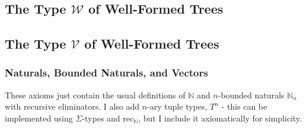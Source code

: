 \documentclass{article}
\newcommand{\set}[1]{\mathcal{U}_#1}
\newcommand{\W}{\mathcal{W}}
\newcommand{\V}{\mathcal{V}}
\newcommand{\nat}{\mathbb{N}}
\newcommand{\rec}{\mathrm{rec}}
\newcommand{\fun}[2]{\lambda #1. #2}
\newcommand{\for}[2]{\Pi_{#1}#2}
\newcommand{\evals}{\rightsquigarrow^{nf}}
\begin{document}
\subsection{The Type $\W$ of Well-Formed Trees}


\subsection{The Type $\V$ of Well-Formed Trees}

\subsubsection{Naturals, Bounded Naturals, and Vectors}

These axioms just contain the usual definitions of $\nat$ and $n$-bounded naturals $\nat_n$ with recursive eliminators. I also add $n$-ary tuple types, $T^n$ - this can be implemented using $\Sigma$-types and $\rec_\nat$, but I include it axiomatically for simplicity.
\end{document}
